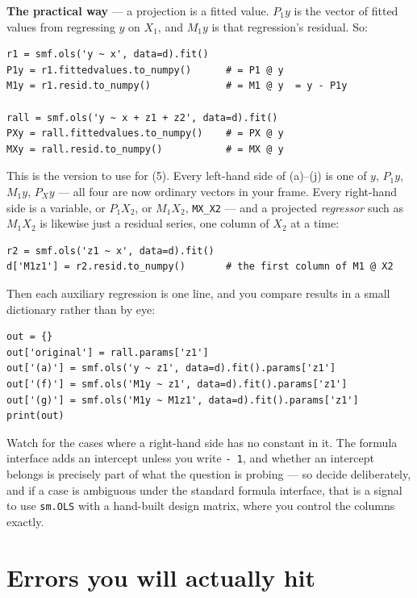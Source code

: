\documentclass[11pt]{article}
\newcommand{\code}[1]{\texttt{#1}}
\begin{document}
\noindent\textbf{The practical way} --- a projection is a fitted value. $P_1 y$
is the vector of fitted values from regressing $y$ on $X_1$, and $M_1 y$ is that
regression's residual. So:

\begin{lstlisting}
r1 = smf.ols('y ~ x', data=d).fit()
P1y = r1.fittedvalues.to_numpy()      # = P1 @ y
M1y = r1.resid.to_numpy()             # = M1 @ y  = y - P1y

rall = smf.ols('y ~ x + z1 + z2', data=d).fit()
PXy = rall.fittedvalues.to_numpy()    # = PX @ y
MXy = rall.resid.to_numpy()           # = MX @ y
\end{lstlisting}

\noindent This is the version to use for (5). Every left-hand side of (a)--(j)
is one of $y$, $P_1y$, $M_1y$, $P_Xy$ --- all four are now ordinary vectors in
your frame. Every right-hand side is a variable, or $P_1X_2$, or $M_1X_2$,
\code{MX\_X2} --- and a projected \emph{regressor} such as $M_1X_2$ is likewise
just a residual series, one column of $X_2$ at a time:

\begin{lstlisting}
r2 = smf.ols('z1 ~ x', data=d).fit()
d['M1z1'] = r2.resid.to_numpy()       # the first column of M1 @ X2
\end{lstlisting}

\noindent Then each auxiliary regression is one line, and you compare results
in a small dictionary rather than by eye:

\begin{lstlisting}
out = {}
out['original'] = rall.params['z1']
out['(a)'] = smf.ols('y ~ z1', data=d).fit().params['z1']
out['(f)'] = smf.ols('M1y ~ z1', data=d).fit().params['z1']
out['(g)'] = smf.ols('M1y ~ M1z1', data=d).fit().params['z1']
print(out)
\end{lstlisting}

\noindent Watch for the cases where a right-hand side has no constant in it.
The formula interface adds an intercept unless you write \code{- 1}, and whether
an intercept belongs is precisely part of what the question is probing --- so
decide deliberately, and if a case is ambiguous under the standard formula
interface, that is a signal to use \code{sm.OLS} with a hand-built design matrix,
where you control the columns exactly.

\section{Errors you will actually hit}
\end{document}
